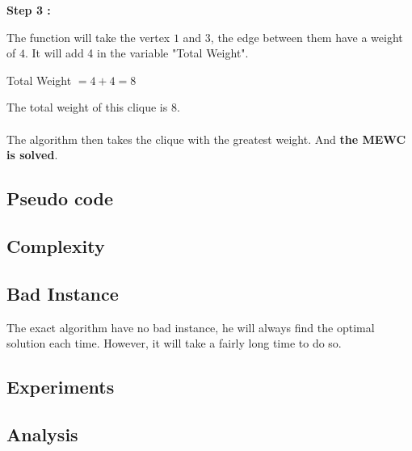     \hspace*{1cm}  \textbf{Step 3 :}
    \\
    \begin{minipage}{0.4\textwidth}
    \end{minipage}
    \begin{minipage}{0.6\textwidth}
        The function will take the vertex $1$ and $3$, the edge between them have a weight of $4$. It will add 4 in the variable "Total Weight".
    \end{minipage}
    \begin{center}
        Total Weight $= 4 + 4 = 8$
    \end{center}

    The total weight of this clique is 8.
    \\ \\
    The algorithm then takes the clique with the greatest weight. And \textbf{the MEWC is solved}.


\subsection{Pseudo code}


\subsection{Complexity}


\subsection{Bad Instance}
    
    The exact algorithm have no bad instance, he will always find the optimal solution each time. However, it will take a fairly long time to do so.


\subsection{Experiments}


\subsection{Analysis}

\newpage
